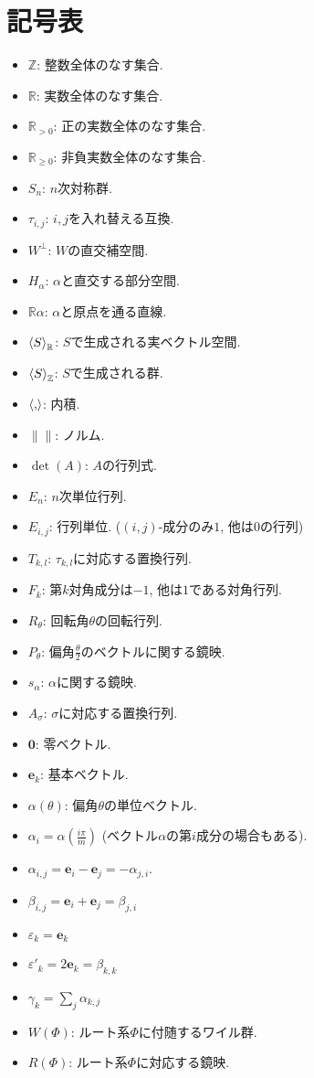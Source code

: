 \documentclass[tombow,dvipdfmx]{jsbook}
\theoremstyle{plain}
\theoremstyle{remark}
\theoremstyle{definition}
\newcommand{\ZZ}{\mathbb{Z}}
\newcommand{\RR}{\mathbb{R}}
\newcommand{\ee}{\boldsymbol{e}}
\newcommand{\zzero}{\boldsymbol{0}}
\begin{document}
\section*{記号表}
\begin{itemize}
\item $\ZZ$: 整数全体のなす集合.
\item $\RR$: 実数全体のなす集合.
\item $\RR_{>0}$: 正の実数全体のなす集合.
\item $\RR_{\geq 0}$: 非負実数全体のなす集合.
\item $S_n$: $n$次対称群.
\item $\tau_{i,j}$: $i,j$を入れ替える互換.
\item $W^{\perp}$: $W$の直交補空間.
\item $H_\alpha$: $\alpha$と直交する部分空間.
\item $\RR\alpha$: $\alpha$と原点を通る直線.
\item $\Braket{S}_\RR$: $S$で生成される実ベクトル空間.
\item $\Braket{S}_\ZZ$: $S$で生成される群.
\item $\Braket{,}$: 内積.
\item $\|\|$: ノルム.
\item $\det(A)$: $A$の行列式.
\item $E_n$: $n$次単位行列.
\item $E_{i,j}$: 行列単位. ($(i,j)$-成分のみ$1$, 他は$0$の行列)
\item $T_{k,l}$: $\tau_{k,l}$に対応する置換行列.
\item $F_k$: 第$k$対角成分は$-1$, 他は$1$である対角行列.
\item $R_\theta$: 回転角$\theta$の回転行列.
\item $P_\theta$: 偏角$\frac{\theta}{2}$のベクトルに関する鏡映.
\item $s_\alpha$: $\alpha$に関する鏡映.
\item $A_\sigma$: $\sigma$に対応する置換行列.
\item $\zzero$: 零ベクトル.
\item $\ee_k$: 基本ベクトル.
\item $\alpha(\theta)$: 偏角$\theta$の単位ベクトル.
\item $\alpha_i=\alpha(\frac{i\pi}{m})$ (ベクトル$\alpha$の第$i$成分の場合もある).
\item $\alpha_{i,j}=\ee_i-\ee_j=-\alpha_{j,i}$.
\item $\beta_{i,j}=\ee_i+\ee_j=\beta_{j,i}$
\item $\varepsilon_k = \ee_k$
\item $\varepsilon'_k = 2\ee_k = \beta_{k,k}$
\item $\gamma_k=\sum_j\alpha_{k,j}$
\item $W(\Phi)$: ルート系$\Phi$に付随するワイル群.
\item $R(\Phi)$: ルート系$\Phi$に対応する鏡映.
\end{itemize}

\end{document}
